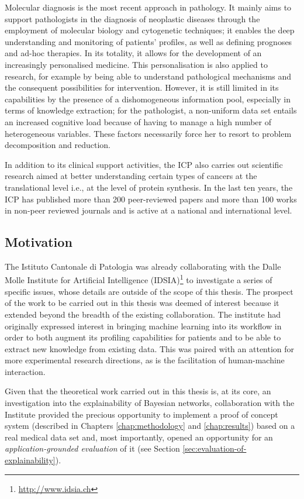 Molecular diagnosis is the most recent approach in pathology. 
It mainly aims to support pathologists in the diagnosis of neoplastic diseases through the employment of molecular biology and cytogenetic techniques; it enables the deep understanding and monitoring of patients' profiles, as well as defining prognoses and ad-hoc therapies. 
In its totality, it allows for the development of an increasingly personalised medicine.
This personalisation is also applied to research, for example by being able to understand  pathological mechanisms and the consequent possibilities for intervention.
However, it is still limited in its capabilities by the presence of a dishomogeneous information pool, especially in terms of knowledge extraction; for the pathologist, a non-uniform data set entails an increased cognitive load because of having to manage a high number of heterogeneous variables.
These factors necessarily force her to resort to problem decomposition and reduction.

In addition to its clinical support activities, the ICP also carries out scientific research aimed at better understanding certain types of cancers at the translational level i.e., at the level of protein synthesis.
In the last ten years, the ICP has published more than 200 peer-reviewed papers and more than 100 works in non-peer reviewed journals and is active at a national and international level.

\subsection{Motivation} \label{subsec:motivation}
The Istituto Cantonale di Patologia was already collaborating with the Dalle Molle Institute for Artificial Intelligence (IDSIA)\footnote{\url{http://www.idsia.ch}} to investigate a series of specific issues, whose details are outside of the scope of this thesis.
The prospect of the work to be carried out in this thesis was deemed of interest because it extended beyond the breadth of the existing collaboration.
The institute had originally expressed interest in bringing machine learning into its workflow in order to both augment its profiling capabilities for patients and to be able to extract new knowledge from existing data.
This was paired with an attention for more experimental research directions, as is the facilitation of human-machine interaction.

Given that the theoretical work carried out in this thesis is, at its core, an investigation into the explainability of Bayesian networks, collaboration with the Institute provided the precious opportunity to implement a proof of concept system (described in Chapters \ref{chap:methodology} and \ref{chap:results}) based on a real medical data set and, most importantly, opened an opportunity for an \textit{application-grounded evaluation} of it (see Section \ref{sec:evaluation-of-explainability}).


